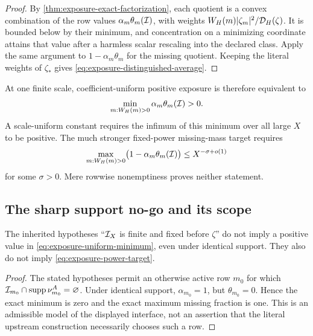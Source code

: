 \begin{proof}
By \cref{thm:exposure-exact-factorization}, each quotient is a convex
combination of the row values \(\alpha_m\theta_m(\mathcal I)\), with weights
\(W_H(m)|\zeta_m|^2/\mathcal D_H(\zeta)\).  It is bounded below by their minimum,
and concentration on a minimizing coordinate attains that value after a
harmless scalar rescaling into the declared class.  Apply the same argument
to \(1-\alpha_m\theta_m\) for the missing quotient.  Keeping the literal
weights of \(\zeta_*\) gives \eqref{eq:exposure-distinguished-average}.
\end{proof}

At one finite scale, coefficient-uniform positive exposure is therefore
equivalent to
\begin{equation}
 \min_{m:W_H(m)>0}\alpha_m\theta_m(\mathcal I)>0.
 \label{eq:exposure-finite-positive-uniform}
\end{equation}
A scale-uniform constant requires the infimum of this minimum over all
large \(X\) to be positive.  The much stronger fixed-power missing-mass
target requires
\begin{equation}
 \max_{m:W_H(m)>0}
 \bigl(1-\alpha_m\theta_m(\mathcal I)\bigr)
 \le X^{-\sigma+o(1)}
 \label{eq:exposure-power-target}
\end{equation}
for some \(\sigma>0\).  Mere rowwise nonemptiness proves neither statement.

\subsection{The sharp support no-go and its scope}

\begin{corollary}
\label{cor:exposure-finite-relation-no-go}
The inherited hypotheses ``\(\mathcal I_X\) is finite and fixed before
\(\zeta\)'' do not imply a positive value in
\eqref{eq:exposure-uniform-minimum}, even under identical support.  They
also do not imply \eqref{eq:exposure-power-target}.
\end{corollary}

\begin{proof}
The stated hypotheses permit an otherwise active row \(m_0\) for which
\(\mathcal I_{m_0}\cap\operatorname{supp}\nu_{m_0}^A=\varnothing\).  Under identical support,
\(\alpha_{m_0}=1\), but \(\theta_{m_0}=0\).  Hence the exact minimum is
zero and the exact maximum missing fraction is one.  This is an admissible
model of the displayed interface, not an assertion that the literal
upstream construction necessarily chooses such a row.
\end{proof}


